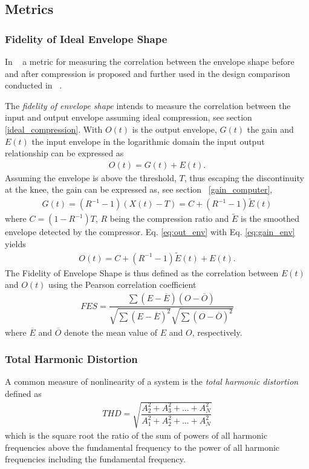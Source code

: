 \documentclass[../main2.tex]{subfiles}
\begin{document}
\subsection{Metrics}

\subsubsection{Fidelity of Ideal Envelope Shape} \label{fes}
In ~\cite{stone2007quantifying} a metric for measuring the correlation between the envelope shape before and after compression is proposed and further used in the design comparison conducted in ~\cite{reiss2012tutorial}. 

The \emph{fidelity of envelope shape} intends to measure the correlation between the input and output envelope assuming ideal compression, see section \ref{ideal_compression}.
With $O(t)$ is the output envelope, $G(t)$ the gain and $E(t)$ the input envelope in the logarithmic domain the input output relationship can be expressed as
 \begin{align}
O(t) = G(t) + E(t).
\label{eq:out_env}
\end{align}
Assuming the envelope is above the threshold, $T$, thus escaping the discontinuity at the knee, the gain can be expressed as, see section ~\ref{gain_computer},
\begin{align}
G(t) = (R^{-1}-1)(X(t)-T) = C + (R^{-1}-1)\tilde{E}(t)
\label{eq:gain_env}
\end{align}
where $C = (1-R^{-1})T$, $R$ being the compression ratio and $\tilde{E}$ is the smoothed envelope detected by the compressor. Eq. \eqref{eq:out_env} with Eq. \eqref{eq:gain_env} yields
\begin{align}
O(t) = C + (R^{-1}-1)\tilde{E}(t) + E(t).
\end{align}
The Fidelity of Envelope Shape is thus defined as the correlation between $E(t)$ and $O(t)$ using the Pearson correlation coefficient
\begin{align}
FES = \dfrac{\sum(E-\overline{E})(O-\overline{O})}{\sqrt{\sum(E-\overline{E})^2}\sqrt{\sum(O-\overline{O})^2}}
\end{align}
where $\overline{E}$ and $\overline{O}$ denote the mean value of $E$ and $O$, respectively.

\subsubsection{Total Harmonic Distortion}
A common measure of nonlinearity of a system is the \emph{total harmonic distortion} defined as \cite{dafx02}
\begin{align}
THD = \sqrt{\dfrac{A_2^2 + A_3^2 + ... + A_N^2}{A_1^2 + A_2^2 + ... + A_N^2}}
\end{align}
which is the square root the ratio of the sum of powers of all harmonic frequencies above the fundamental frequency to the power of all harmonic frequencies including the fundamental frequency.
\end{document}
